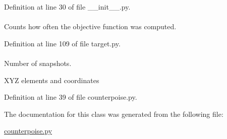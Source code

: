 \-Definition at line 30 of file \-\_\-\-\_\-init\-\_\-\-\_\-.\-py.

\hypertarget{classforcebalance_1_1target_1_1Target_ad4cd0ab38d8fc97d3e7a6e22ce130a16}{
\paragraph[{xct}]{}}\label{classforcebalance_1_1target_1_1Target_ad4cd0ab38d8fc97d3e7a6e22ce130a16}


\-Counts how often the objective function was computed. 



\-Definition at line 109 of file target.\-py.

\hypertarget{classforcebalance_1_1counterpoise_1_1Counterpoise_a1f1d1dea143c1e48971834d1c59ea1af}{
\paragraph[{xyzs}]{}}\label{classforcebalance_1_1counterpoise_1_1Counterpoise_a1f1d1dea143c1e48971834d1c59ea1af}


\-Number of snapshots. 

\-X\-Y\-Z elements and coordinates 

\-Definition at line 39 of file counterpoise.\-py.



\-The documentation for this class was generated from the following file\-:\begin{DoxyCompactItemize}
\item 
\hyperlink{counterpoise_8py}{counterpoise.\-py}\end{DoxyCompactItemize}
